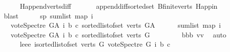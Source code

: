 \begin{isabellebody}
\ \ \ \ \isamarkupfalse%
\ H{}{\isachardot}{\kern0pt}append{\isacharunderscore}{\kern0pt}verts{\isacharunderscore}{\kern0pt}diff\ \isanewline
\ \ \ \ \isamarkupfalse%
\ append{\isacharunderscore}{\kern0pt}diff{\isacharunderscore}{\kern0pt}sorted{\isacharunderscore}{\kern0pt}set\ B{}{\isachardot}{\kern0pt}finite{\isacharunderscore}{\kern0pt}verts\ H{}{\isachardot}{\kern0pt}app{\isacharunderscore}{\kern0pt}in\ \isanewline
\ \ \ \ \isamarkupfalse%
\ blast\ \isanewline
\ \ \ \isamarkupfalse%
\ sp{}{\isacharcolon}{\kern0pt}\ {\isachardoublequoteopen}sum{\isacharunderscore}{\kern0pt}list\ {\isacharparenleft}{\kern0pt}map\ {\isacharparenleft}{\kern0pt}{\isasymlambda}i{\isachardot}{\kern0pt}\isanewline
\ \ \ {\isacharparenleft}{\kern0pt}vote{\isacharunderscore}{\kern0pt}Spectre\ G{\isacharunderscore}{\kern0pt}A\ i\ b\ c{\isacharparenright}{\kern0pt}{\isacharparenright}{\kern0pt}\ {\isacharparenleft}{\kern0pt}sorted{\isacharunderscore}{\kern0pt}list{\isacharunderscore}{\kern0pt}of{\isacharunderscore}{\kern0pt}set\ {\isacharparenleft}{\kern0pt}verts\ G{\isacharunderscore}{\kern0pt}A{\isacharparenright}{\kern0pt}{\isacharparenright}{\kern0pt}{\isacharparenright}{\kern0pt}\ {\isacharequal}{\kern0pt}\ \isanewline
\ \ \ \ sum{\isacharunderscore}{\kern0pt}list\ {\isacharparenleft}{\kern0pt}map\ {\isacharparenleft}{\kern0pt}{\isasymlambda}i{\isachardot}{\kern0pt}\isanewline
\ \ \ {\isacharparenleft}{\kern0pt}vote{\isacharunderscore}{\kern0pt}Spectre\ G{\isacharunderscore}{\kern0pt}A\ i\ b\ c{\isacharparenright}{\kern0pt}{\isacharparenright}{\kern0pt}\ {\isacharparenleft}{\kern0pt}sorted{\isacharunderscore}{\kern0pt}list{\isacharunderscore}{\kern0pt}of{\isacharunderscore}{\kern0pt}set\ {\isacharparenleft}{\kern0pt}verts\ G{\isacharparenright}{\kern0pt}{\isacharparenright}{\kern0pt}{\isacharparenright}{\kern0pt}\ {\isacharplus}{\kern0pt}\ {}{\isachardoublequoteclose}\ \isanewline
\ \ \ \ \isamarkupfalse%
\ bbb\ vv\ \isamarkupfalse%
\ auto\ \ \isanewline
\ \ \ \ \isamarkupfalse%
\ leee{\isacharcolon}{\kern0pt}\ {\isachardoublequoteopen}{\isacharparenleft}{\kern0pt}{\isasymSum}i{\isasymleftarrow}sorted{\isacharunderscore}{\kern0pt}list{\isacharunderscore}{\kern0pt}of{\isacharunderscore}{\kern0pt}set\ {\isacharparenleft}{\kern0pt}verts\ G{\isacharparenright}{\kern0pt}{\isachardot}{\kern0pt}\ vote{\isacharunderscore}{\kern0pt}Spectre\ G\ i\ b\ c{\isacharparenright}{\kern0pt}\ {\isasymle}\isanewline

\end{isabellebody}
